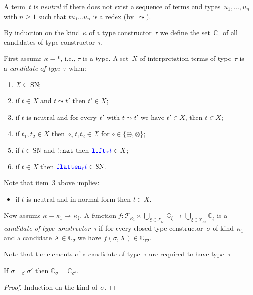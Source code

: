 \documentclass[runningheads,a4paper]{llncs}
\newcommand{\arrkind}{\Rightarrow}
\newcommand{\Tc}{\mathcal{T}}
\newcommand{\nat}{\mathtt{nat}}
\newcommand{\flatten}{\mathtt{flatten}}
\newcommand{\lift}{\mathtt{lift}}
\newcommand{\SN}{\mathrm{SN}}
\newcommand{\Cb}{\mathbb{C}}
\newcommand{\CKchange}[1]{\textcolor{blue}{#1}}
\begin{document}
\begin{definition}\label{def_candidate}\normalfont
  A term~$t$ is \emph{neutral} if there does not exist a sequence of
  terms and types~$u_1,\ldots,u_n$ with $n \ge 1$ such that $t u_1
  \ldots u_n$ is a redex (by~$\leadsto$).

  By induction on the kind~$\kappa$ of a type constructor~$\tau$ we
  define the set~$\Cb_\tau$ of all candidates of type
  constructor~$\tau$.

  First assume $\kappa=*$, i.e., $\tau$ is a type. A set~$X$ of
  interpretation terms of type~$\tau$ is a \emph{candidate of
    type~$\tau$} when:
  \begin{enumerate}
  \item $X \subseteq \SN$;
  \item if $t \in X$ and $t \leadsto t'$ then $t' \in X$;
  \item if $t$ is neutral and for every~$t'$ with $t \leadsto t'$ we
    have $t' \in X$, then $t \in X$;
  \item if $t_1,t_2 \in X$ then $\circ_\tau t_1 t_2 \in X$ for
    $\circ \in \{\oplus,\otimes\}$;
  \item if $t \in \SN$ and $t : \nat$ then $\CKchange{\lift_\tau t}
    \in X$;
  \item if $t \in X$ then $\CKchange{\flatten_\tau t} \in \SN$.
  \end{enumerate}
  Note that item~3 above implies:
  \begin{itemize}
  \item if $t$ is neutral and in normal form then $t \in X$.
  \end{itemize}

  Now assume $\kappa = \kappa_1\arrkind\kappa_2$. A function $f :
  \Tc_{\kappa_1} \times \bigcup_{\xi\in\Tc_{\kappa_1}}\Cb_\xi \to
  \bigcup_{\xi\in\Tc_{\kappa_2}}\Cb_\xi$ is a \emph{candidate of type
    constructor~$\tau$} if for every closed type constructor~$\sigma$
  of kind~$\kappa_1$ and a candidate $X \in \Cb_\sigma$ we have
  $f(\sigma,X) \in \Cb_{\tau\sigma}$.
\end{definition}

Note that the elements of a candidate of type~$\tau$ are required to
have type~$\tau$.

\begin{lemma}\label{lem_beta_candidate}
  If $\sigma =_\beta \sigma'$ then $\Cb_\sigma = \Cb_{\sigma'}$.
\end{lemma}

\begin{proof}
  Induction on the kind of~$\sigma$.
\end{proof}
\end{document}
